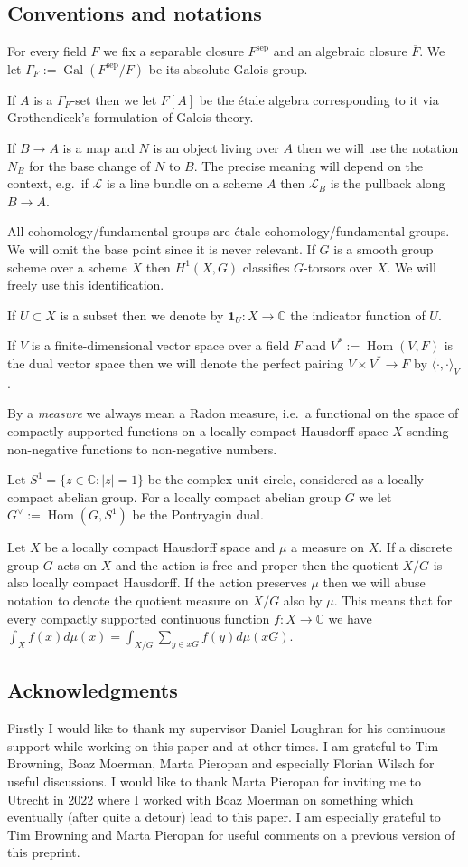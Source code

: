 \documentclass[a4paper,11pt,reqno]{amsart}
\newcommand{\C}{\mathbb{C}}
\DeclareMathOperator{\Hom}{Hom}
\DeclareMathOperator{\Gal}{Gal}
\DeclareMathOperator{\sep}{sep}
\theoremstyle{definition}
\begin{document}
\subsection{Conventions and notations}
For every field $F$ we fix a separable closure $F^{\sep}$ and an algebraic closure $\overline{F}$. We let $\Gamma_F := \Gal(F^{\sep}/F)$ be its absolute Galois group. 

If $A$ is a $\Gamma_F$-set then we let $F[A]$ be the \'etale algebra corresponding to it via Grothendieck's formulation of Galois theory.

If $B \to A$ is a map and $N$ is an object living over $A$ then we will use the notation $N_B$ for the base change of $N$ to $B$. The precise meaning will depend on the context, e.g.~if $\mathcal{L}$ is a line bundle on a scheme $A$ then $\mathcal{L}_B$ is the pullback along $B \to A$.

All cohomology/fundamental groups are \'etale cohomology/fundamental groups. We will omit the base point since it is never relevant. If $G$ is a smooth group scheme over a scheme $X$ then $H^1(X, G)$ classifies $G$-torsors over $X$. We will freely use this identification.

If $U \subset X$ is a subset then we denote by $\mathbf{1}_U: X \to \C$ the indicator function of $U$.

If $V$ is a finite-dimensional vector space over a field $F$ and $V^* := \Hom(V, F)$ is the dual vector space then we will denote the perfect pairing $V \times V^* \to F$ by $\langle \cdot, \cdot \rangle_V$. 

By a \emph{measure} we always mean a Radon measure, i.e.~a functional on the space of compactly supported functions on a locally compact Hausdorff space $X$ sending non-negative functions to non-negative numbers.

Let $S^1 = \{z \in \C: |z| = 1\}$ be the complex unit circle, considered as a locally compact abelian group. For a locally compact abelian group $G$ we let $G^{\vee} := \Hom(G, S^1)$ be the Pontryagin dual.

Let $X$ be a locally compact Hausdorff space and $\mu$ a measure on $X$. If a discrete group $G$ acts on $X$ and the action is free and proper then the quotient $X/G$ is also locally compact Hausdorff. If the action preserves $\mu$ then we will abuse notation to denote the quotient measure on $X/G$ also by $\mu$. This means that for every compactly supported continuous function $f: X \to \C$ we have $\int_X f(x) d \mu(x) = \int_{X/G} \sum_{y \in xG} f(y) d \mu(xG)$.
\subsection*{Acknowledgments}
Firstly I would like to thank my supervisor Daniel Loughran for his continuous support while working on this paper and at other times. I am grateful to Tim Browning, Boaz Moerman, Marta Pieropan and especially Florian Wilsch for useful discussions. I would like to thank Marta Pieropan for inviting me to Utrecht in 2022 where I worked with Boaz Moerman on something which eventually (after quite a detour) lead to this paper. I am especially grateful to Tim Browning and Marta Pieropan for useful comments on a previous version of this preprint.
\end{document}
